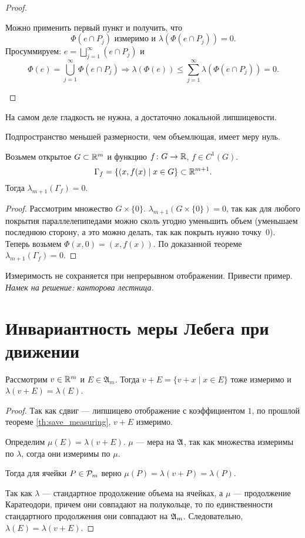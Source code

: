 \begin{proof}
\begin{description}
\begin{enumerate}
					Можно применить первый пункт и получить, что
					\[
						\Phi (e \cap P_j) \text{ измеримо и }  \lambda (\Phi (e \cap P_j)) = 0
					.\]
					Просуммируем:
					$
					e = \bigsqcup_{j=1}^{\infty} (e \cap P_j)
					$ и
					\[
						\Phi (e) = \bigcup_{j=1}^{\infty} \Phi (e \cap P_j) \Longrightarrow \lambda (\Phi (e)) \le  \sum_{j=1}^{\infty} \lambda (\Phi (e \cap P_j)) = 0
					.\]
			\end{enumerate}
	\end{description}
\end{proof}
\begin{rem}
	На самом деле гладкость не нужна, а достаточно локальной липшицевости.
\end{rem}
\begin{rem}
	Подпространство меньшей размерности, чем объемлющая, имеет меру нуль.
\end{rem}
\begin{cor}
	Возьмем открытое $ G \subset \R^{m} $ и функцию $ f\colon G \to \R$, $ f \in C^{1}(G)$. \[
		\Gamma _{f} = \{(x, f(x) \mid x \in G\} \subset \R^{m+1}
	.\]
	Тогда $ \lambda _{m+1}(\Gamma _f) = 0$.
\end{cor}
\begin{proof}
	Рассмотрим множество $ G\times \{0\} $. $ \lambda _{m+1}(G \times \{0\}) = 0$, так как для любого покрытия параллелепипедами можно сколь угодно уменьшить объем (уменьшаем последнюю сторону, а это можно делать, так как покрыть нужно точку~$ 0$). Теперь возьмем $ \Phi (x, 0) = (x, f(x))$.
	По доказанной теореме $ \lambda _{m+1}(\Gamma _{f}) = 0$.
\end{proof}
\begin{probl}
	Измеримость не сохраняется при непрерывном отображении. Привести пример. \textit{Намек на решение: канторова лестница.}
\end{probl}

\section{Инвариантность меры Лебега при движении}
\begin{thm}
	Рассмотрим $ v \in  \R^{m} $ и $ E \in \mathfrak{A}_{m}$. Тогда
	$ v + E = \{v + x \mid x \in E\}$ тоже измеримо и $ \lambda (v + E) = \lambda (E)$.
\end{thm}
\begin{proof}
	Так как сдвиг --- липшицево отображение с коэффициентом $ 1$, по прошлой теореме \ref{th:save_measuring},  $ v + E$ измеримо.

	Определим $ \mu(E) = \lambda (v + E)$. $ \mu$ --- мера на $ \A$, так как множества измеримы по $ \lambda $, согда они измеримы по $ \mu$.

	Тогда для ячейки $ P \in \P_m$ верно $ \mu(P) = \lambda (v + P) = \lambda (P)$.

	Так как $ \lambda $ --- стандартное продолжение объема на ячейках, а $ \mu$ --- продолжение Каратеодори, причем они совпадают на полукольце, то по единственности стандартного продолжения они совпадают на $ \A_{m}$. Следовательно, $ \lambda (E) = \lambda (v + E)$.
\end{proof}

